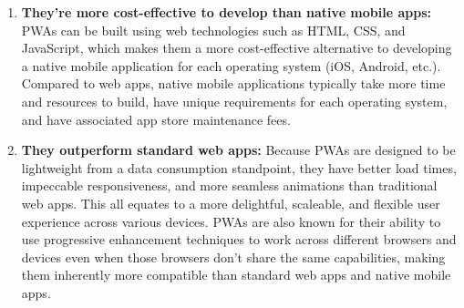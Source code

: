 \documentclass[12pt]{article}
\begin{document}
\begin{enumerate}
    \item \textbf{They’re more cost-effective to develop than native mobile apps:} PWAs can be built using web technologies such as HTML, CSS, and JavaScript, which makes them a more cost-effective alternative to developing a native mobile application for each operating system (iOS, Android, etc.). Compared to web apps, native mobile applications typically take more time and resources to build, have unique requirements for each operating system, and have associated app store maintenance fees.
    \item \textbf{They outperform standard web apps:} Because PWAs are designed to be lightweight from a data consumption standpoint, they have better load times, impeccable responsiveness, and more seamless animations than traditional web apps. This all equates to a more delightful, scaleable, and flexible user experience across various devices. PWAs are also known for their ability to use progressive enhancement techniques to work across different browsers and devices even when those browsers don’t share the same capabilities, making them inherently more compatible than standard web apps and native mobile apps. 
\end{enumerate}
\citep{pwaBenefits}



     
     
\end{document}
